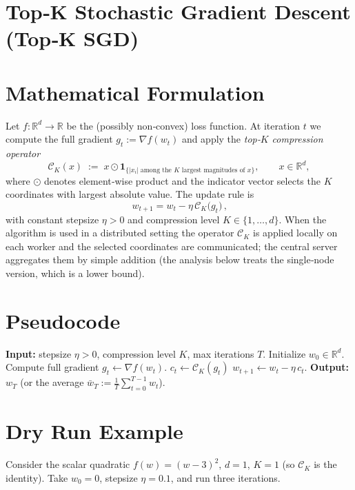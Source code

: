 \documentclass{article}
\newcommand{\R}{\mathbb{R}}
\begin{document}
\section*{Top‑K Stochastic Gradient Descent (Top‑K SGD)}

\section*{Mathematical Formulation}
Let $f:\R^{d}\rightarrow\R$ be the (possibly non‑convex) loss function.  
At iteration $t$ we compute the full gradient $g_{t}:=\nabla f(w_{t})$ and
apply the \emph{top‑$K$ compression operator}
\[
\mathcal{C}_{K}(x)\;:=\;x\odot \mathbf{1}_{\{|x_{i}|\;\text{among the $K$ largest magnitudes of }x\}},
\qquad x\in\R^{d},
\]
where $\odot$ denotes element‑wise product and the indicator vector selects the
$K$ coordinates with largest absolute value.  
The update rule is
\begin{equation}
\boxed{\,w_{t+1}=w_{t}-\eta\,\mathcal{C}_{K}\!\bigl(g_{t}\bigr)\,},
\label{eq:update}
\end{equation}
with constant stepsize $\eta>0$ and compression level $K\in\{1,\dots,d\}$.
When the algorithm is used in a distributed setting the operator
$\mathcal{C}_{K}$ is applied locally on each worker and the selected
coordinates are communicated; the central server aggregates them by simple
addition (the analysis below treats the single‑node version, which is a
lower bound).

\section*{Pseudocode}
\begin{algorithm}[H]
\caption{Top‑K SGD}
\begin{algorithmic}[1]
\State \textbf{Input:} stepsize $\eta>0$, compression level $K$, max iterations $T$.
\State Initialize $w_{0}\in\R^{d}$.
    \State Compute full gradient $g_{t}\gets\nabla f(w_{t})$.
    \State $c_{t}\gets\mathcal{C}_{K}(g_{t})$ 
    \State $w_{t+1}\gets w_{t}-\eta\,c_{t}$.
\EndFor
\State \textbf{Output:} $w_{T}$ (or the average $\bar w_{T}:=\frac1T\sum_{t=0}^{T-1}w_{t}$).
\end{algorithmic}
\end{algorithm}

\section*{Dry Run Example}
Consider the scalar quadratic $f(w)=(w-3)^{2}$, $d=1$, $K=1$ (so $\mathcal{C}_{K}$ is the identity).  
Take $w_{0}=0$, stepsize $\eta=0.1$, and run three iterations.
\end{document}
